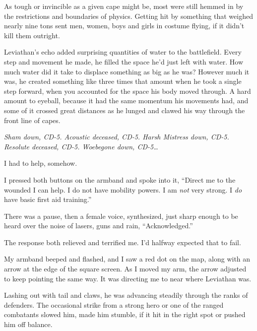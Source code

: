 





As tough or invincible as a given cape might be, most were still hemmed in by the restrictions and boundaries of physics.  Getting hit by something that weighed nearly nine tons sent men, women, boys and girls in costume flying, if it didn't kill them outright.



Leviathan's echo added surprising quantities of water to the battlefield.  Every step and movement he made, he filled the space he'd just left with water.  How much water did it take to displace something as big as he was?  However much it was, he created something like three times that amount when he took a single step forward, when you accounted for the space his body moved through.  A hard amount to eyeball, because it had the same momentum his movements had, and some of it crossed great distances as he lunged and clawed his way through the front line of capes.



\emph{Sham down, CD-5.  Acoustic deceased, CD-5.  Harsh Mistress down, CD-5.  Resolute deceased, CD-5.  Woebegone down, CD-5\ldots}



I had to help, somehow.



I pressed both buttons on the armband and spoke into it, ``Direct me to the wounded I can help.  I do not have mobility powers.  I am \emph{not} very strong.  I \emph{do} have basic first aid training.''



There was a pause, then a female voice, synthesized, just sharp enough to be heard over the noise of lasers, guns and rain, ``Acknowledged.''



The response both relieved and terrified me.  I'd halfway expected that to fail.



My armband beeped and flashed, and I saw a red dot on the map, along with an arrow at the edge of the square screen.  As I moved my arm, the arrow adjusted to keep pointing the same way.  It was directing me to near where Leviathan was.



Lashing out with tail and claws, he was advancing steadily through the ranks of defenders.  The occasional strike from a strong hero or one of the ranged combatants slowed him, made him stumble, if it hit in the right spot or pushed him off balance.




